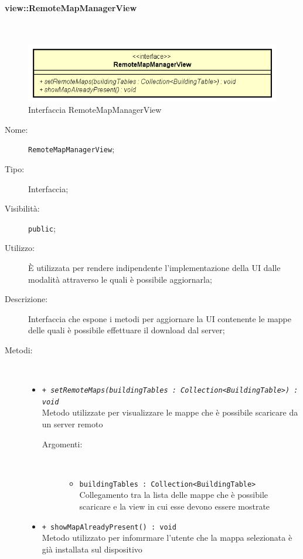 \documentclass[../DefinizioneDiProdotto.tex]{subfiles}
\begin{document}
\paragraph{view::RemoteMapManagerView}
\
\begin{figure}[H]
	\centering
	\includegraphics[width=\maxwidth]{img/RemoteMapManagerView.png}
	\caption{Interfaccia RemoteMapManagerView}\label{fig:view::RemoteMapManagerView} 
\end{figure}
\begin{description}
	\item[Nome:] \texttt{RemoteMapManagerView};
	\item[Tipo:] Interfaccia;
	\item[Visibilità:] \texttt{public};
	\item[Utilizzo:] È utilizzata per rendere indipendente l'implementazione della UI dalle modalità attraverso le quali è possibile aggiornarla;
	\item[Descrizione:] Interfaccia che espone i metodi per aggiornare la UI contenente le mappe delle quali è possibile effettuare il download dal server;
	\item[Metodi:] \
	\begin{itemize}
		\item \texttt{+ \textit{setRemoteMaps(buildingTables : Collection<BuildingTable>) : void}}\\
		Metodo utilizzate per visualizzare le mappe che è possibile scaricare da un server remoto
		\begin{description}
			\item[Argomenti:] \
			\begin{itemize}
				\item \texttt{buildingTables : Collection<BuildingTable>}\\
				Collegamento tra la lista delle mappe che è possibile scaricare e la view in cui esse devono essere mostrate\end{itemize}
		\end{description}
		\item \texttt{+ showMapAlreadyPresent() : void}\\
		Metodo utilizzato per infomrmare l'utente che la mappa selezionata è già installata sul dispositivo
		
	\end{itemize}
\end{description}
\end{document}
